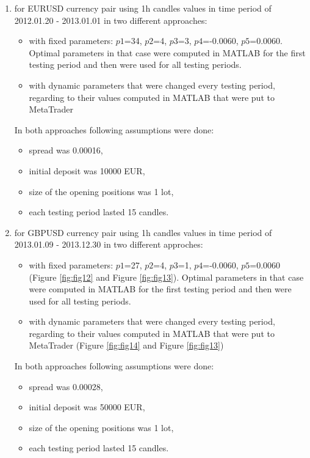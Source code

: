 \documentclass[runningheads,a4paper]{llncs}
\begin{document}
\begin{enumerate}
\item for EURUSD currency pair using 1h candles values in time period of 2012.01.20 - 2013.01.01 in two different approaches:
\begin{itemize}
\item with fixed parameters: $p1$=34, $p2$=4, $p3$=3, $p4$=-0.0060, $p5$=0.0060. Optimal parameters in that case were computed in MATLAB for the first testing period and then were used for all testing periods.
\item with dynamic parameters that were changed every testing period, regarding to their values computed in MATLAB that were put to MetaTrader 
\end{itemize}
In both approaches following assumptions were done:
\begin{itemize}
\item spread was 0.00016, 
\item initial deposit was 10000 EUR,
\item size of the opening positions was 1 lot,
\item each testing period lasted 15 candles.
\end{itemize}
\item for GBPUSD currency pair using 1h candles values in time period of 2013.01.09 - 2013.12.30 in two different approches:
\begin{itemize}
\item with fixed parameters: $p1$=27, $p2$=4, $p3$=1, $p4$=-0.0060, $p5$=0.0060 (Figure \ref{fig:fig12} and Figure \ref{fig:fig13}). Optimal parameters in that case were computed in MATLAB for the first testing period and then were used for all testing periods.
\item with dynamic parameters that were changed every testing period, regarding to their values computed in MATLAB that were put to MetaTrader (Figure \ref{fig:fig14} and Figure \ref{fig:fig13})
\end{itemize}
In both approaches following assumptions were done:
\begin{itemize}
\item spread was 0.00028, 
\item initial deposit was 50000 EUR,
\item size of the opening positions was 1 lot,
\item each testing period lasted 15 candles.
\end{itemize}
\end{enumerate}
\end{document}
